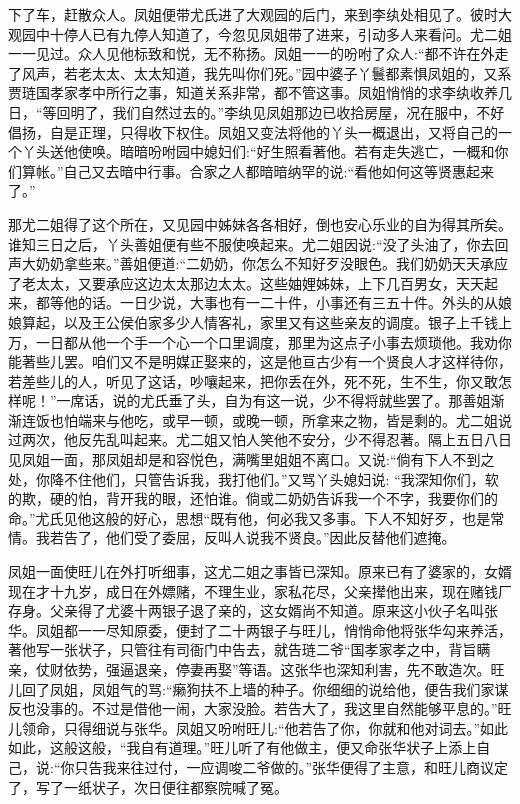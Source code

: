 \begin{parag}
    下了车，赶散众人。凤姐便带尤氏进了大观园的后门，来到李纨处相见了。彼时大观园中十停人已有九停人知道了，今忽见凤姐带了进来，引动多人来看问。尤二姐一一见过。众人见他标致和悦，无不称扬。凤姐一一的吩咐了众人:“都不许在外走了风声，若老太太、太太知道，我先叫你们死。”园中婆子丫鬟都素惧凤姐的，又系贾琏国孝家孝中所行之事，知道关系非常，都不管这事。凤姐悄悄的求李纨收养几日，“等回明了，我们自然过去的。”李纨见凤姐那边已收拾房屋，况在服中，不好倡扬，自是正理，只得收下权住。凤姐又变法将他的丫头一概退出，又将自己的一个丫头送他使唤。暗暗吩咐园中媳妇们:“好生照看著他。若有走失逃亡，一概和你们算帐。”自己又去暗中行事。合家之人都暗暗纳罕的说:“看他如何这等贤惠起来了。”
\end{parag}


\begin{parag}
    那尤二姐得了这个所在，又见园中姊妹各各相好，倒也安心乐业的自为得其所矣。谁知三日之后，丫头善姐便有些不服使唤起来。尤二姐因说:“没了头油了，你去回声大奶奶拿些来。”善姐便道:“二奶奶，你怎么不知好歹没眼色。我们奶奶天天承应了老太太，又要承应这边太太那边太太。这些妯娌姊妹，上下几百男女，天天起来，都等他的话。一日少说，大事也有一二十件，小事还有三五十件。外头的从娘娘算起，以及王公侯伯家多少人情客礼，家里又有这些亲友的调度。银子上千钱上万，一日都从他一个手一个心一个口里调度，那里为这点子小事去烦琐他。我劝你能著些儿罢。咱们又不是明媒正娶来的，这是他亘古少有一个贤良人才这样待你，若差些儿的人，听见了这话，吵嚷起来，把你丢在外，死不死，生不生，你又敢怎样呢！”一席话，说的尤氏垂了头，自为有这一说，少不得将就些罢了。那善姐渐渐连饭也怕端来与他吃，或早一顿，或晚一顿，所拿来之物，皆是剩的。尤二姐说过两次，他反先乱叫起来。尤二姐又怕人笑他不安分，少不得忍著。隔上五日八日见凤姐一面，那凤姐却是和容悦色，满嘴里姐姐不离口。又说:“倘有下人不到之处，你降不住他们，只管告诉我，我打他们。”又骂丫头媳妇说: “我深知你们，软的欺，硬的怕，背开我的眼，还怕谁。倘或二奶奶告诉我一个不字，我要你们的命。”尤氏见他这般的好心，思想“既有他，何必我又多事。下人不知好歹，也是常情。我若告了，他们受了委屈，反叫人说我不贤良。”因此反替他们遮掩。
\end{parag}


\begin{parag}
    凤姐一面使旺儿在外打听细事，这尤二姐之事皆已深知。原来已有了婆家的，女婿现在才十九岁，成日在外嫖赌，不理生业，家私花尽，父亲撵他出来，现在赌钱厂存身。父亲得了尤婆十两银子退了亲的，这女婿尚不知道。原来这小伙子名叫张华。凤姐都一一尽知原委，便封了二十两银子与旺儿，悄悄命他将张华勾来养活，著他写一张状子，只管往有司衙门中告去，就告琏二爷“国孝家孝之中，背旨瞒亲，仗财依势，强逼退亲，停妻再娶”等语。这张华也深知利害，先不敢造次。旺儿回了凤姐，凤姐气的骂:“癞狗扶不上墙的种子。你细细的说给他，便告我们家谋反也没事的。不过是借他一闹，大家没脸。若告大了，我这里自然能够平息的。”旺儿领命，只得细说与张华。凤姐又吩咐旺儿:“他若告了你，你就和他对词去。”如此如此，这般这般，“我自有道理。”旺儿听了有他做主，便又命张华状子上添上自己，说:“你只告我来往过付，一应调唆二爷做的。”张华便得了主意，和旺儿商议定了，写了一纸状子，次日便往都察院喊了冤。
\end{parag}



